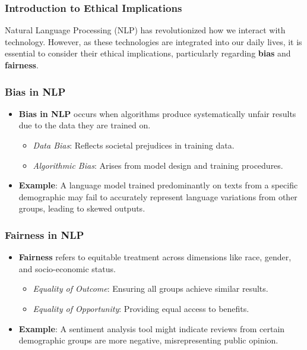 \documentclass[aspectratio=169]{beamer}
\begin{document}
\begin{frame}[fragile]
    \frametitle{Introduction to Ethical Implications}
    Natural Language Processing (NLP) has revolutionized how we interact with technology. 
    However, as these technologies are integrated into our daily lives, it is essential to consider their ethical implications, particularly regarding \textbf{bias} and \textbf{fairness}.
\end{frame}

\begin{frame}[fragile]
    \frametitle{Bias in NLP}
    \begin{itemize}
        \item \textbf{Bias in NLP} occurs when algorithms produce systematically unfair results due to the data they are trained on.
        \begin{itemize}
            \item \textit{Data Bias}: Reflects societal prejudices in training data.
            \item \textit{Algorithmic Bias}: Arises from model design and training procedures.
        \end{itemize}
        \item \textbf{Example}: 
        A language model trained predominantly on texts from a specific demographic may fail to accurately represent language variations from other groups, leading to skewed outputs.
    \end{itemize}
\end{frame}

\begin{frame}[fragile]
    \frametitle{Fairness in NLP}
    \begin{itemize}
        \item \textbf{Fairness} refers to equitable treatment across dimensions like race, gender, and socio-economic status.
        \begin{itemize}
            \item \textit{Equality of Outcome}: Ensuring all groups achieve similar results.
            \item \textit{Equality of Opportunity}: Providing equal access to benefits.
        \end{itemize}
        \item \textbf{Example}: 
        A sentiment analysis tool might indicate reviews from certain demographic groups are more negative, misrepresenting public opinion.
    \end{itemize}
\end{frame}
\end{document}
